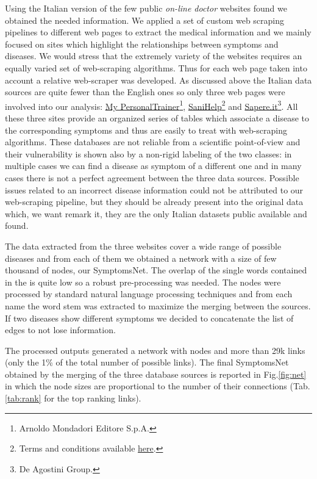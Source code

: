 \documentclass{standalone}
\begin{document}
Using the Italian version of the few public \emph{on-line doctor} websites found we obtained the needed information.
We applied a set of custom web scraping pipelines to different web pages to extract the medical information and we mainly focused on sites which highlight the relationships between symptoms and diseases.
We would stress that the extremely variety of the websites requires an equally varied set of web-scraping algorithms.
Thus for each web page taken into account a relative web-scraper was developed.
As discussed above the Italian data sources are quite fewer than the English ones so only three web pages were involved into our analysis: \href{https://m.my-personaltrainer.it/}{My PersonalTrainer}\footnote{
  Arnoldo Mondadori Editore S.p.A.
}, \href{http://www.sanihelp.it/}{SaniHelp}\footnote{
  Terms and conditions available \href{https://www.iubenda.com/terms-and-conditions/210132}{here}.
} and \href{http://www.sapere.it/}{Sapere.it}\footnote{
  De Agostini Group.
}.
All these three sites provide an organized series of tables which associate a disease to the corresponding symptoms and thus are easily to treat with web-scraping algorithms.
These databases are not reliable from a scientific point-of-view and their vulnerability is shown also by a non-rigid labeling of the two classes: in multiple cases we can find a disease as symptom of a different one and in many cases there is not a perfect agreement between the three data sources.
Possible issues related to an incorrect disease information could not be attributed to our \textsf{web-scraping} pipeline, but they should be already present into the original data which, we want remark it, they are the only Italian datasets public available and found.

The data extracted from the three websites cover a wide range of possible diseases and from each of them we obtained a network with a size of few thousand of nodes, our \textsf{SymptomsNet}.
The overlap of the single words contained in the  is quite low so a robust pre-processing was needed.
The nodes were processed by standard natural language processing techniques and from each name the word stem was extracted to maximize the merging between the sources.
If two diseases show different symptoms we decided to concatenate the list of edges to not lose information.

The processed outputs generated a network with  nodes and more than 29k links (only the 1\% of the total number of possible links).
The final \textsf{SymptomsNet} obtained by the merging of the three database sources is reported in Fig.\ref{fig:net} in which the node sizes are proportional to the number of their connections (Tab.\ref{tab:rank} for the top ranking links).
\end{document}
